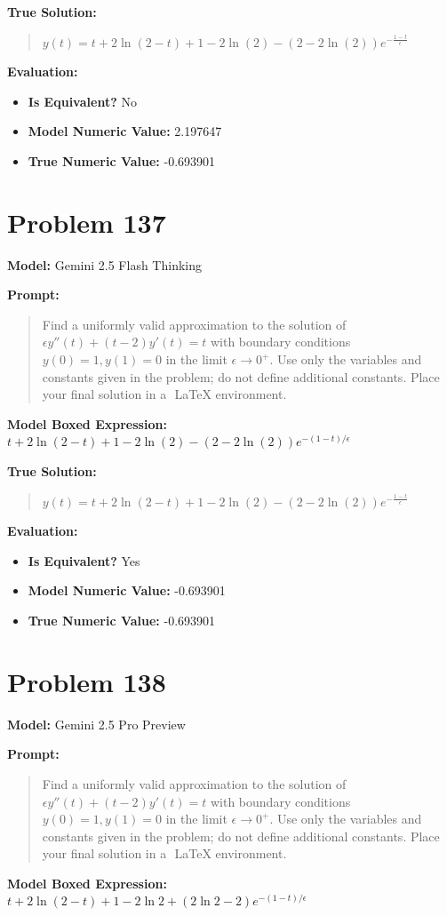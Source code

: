 \documentclass{article}
\begin{document}
{\textbf{True Solution:}
\begin{quote}
$y(t) = t + 2 \ln(2-t) + 1 - 2 \ln(2) - (2 - 2 \ln(2)) e^{-\frac{1-t}{\epsilon}}$
\end{quote}

\textbf{Evaluation:}
\begin{itemize}
\item \textbf{Is Equivalent?} No
\item \textbf{Model Numeric Value:} 2.197647
\item \textbf{True Numeric Value:} -0.693901
\end{itemize}
\vspace{1cm}
\section*{Problem 137}
\textbf{Model:} Gemini 2.5 Flash Thinking

\textbf{Prompt:}
\begin{quote}
Find a uniformly valid approximation to the solution of $\epsilon y''(t) + (t-2) y'(t) = t$ with boundary conditions $y(0) = 1, y(1) = 0$ in the limit $\epsilon \to 0^+$. Use only the variables and constants given in the problem; do not define additional constants. Place your final solution in a $\boxed{}$ LaTeX environment.
\end{quote}
\textbf{Model Boxed Expression:} $t + 2 \ln(2-t) + 1 - 2 \ln(2) - (2-2\ln(2))e^{-(1-t)/\epsilon}$

\textbf{True Solution:}
\begin{quote}
$y(t) = t + 2 \ln(2-t) + 1 - 2 \ln(2) - (2 - 2 \ln(2)) e^{-\frac{1-t}{\epsilon}}$
\end{quote}

\textbf{Evaluation:}
\begin{itemize}
\item \textbf{Is Equivalent?} Yes
\item \textbf{Model Numeric Value:} -0.693901
\item \textbf{True Numeric Value:} -0.693901
\end{itemize}
\vspace{1cm}
\section*{Problem 138}
\textbf{Model:} Gemini 2.5 Pro Preview

\textbf{Prompt:}
\begin{quote}
Find a uniformly valid approximation to the solution of $\epsilon y''(t) + (t-2) y'(t) = t$ with boundary conditions $y(0) = 1, y(1) = 0$ in the limit $\epsilon \to 0^+$. Use only the variables and constants given in the problem; do not define additional constants. Place your final solution in a $\boxed{}$ LaTeX environment.
\end{quote}
\textbf{Model Boxed Expression:} $t + 2\ln(2-t) + 1 - 2\ln 2 + (2\ln 2 - 2)e^{-(1-t)/\epsilon}$

}
\end{document}
